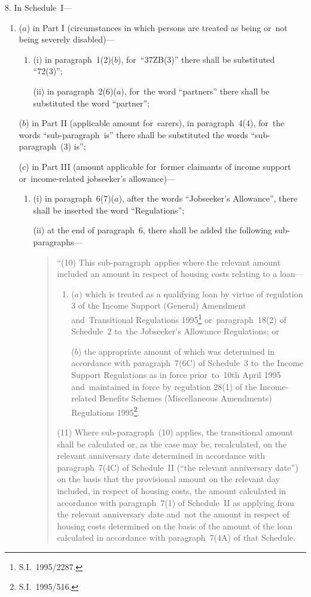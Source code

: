 \documentclass[12pt,a4paper]{article}
\begin{document}
8.  In Schedule~I—
\begin{enumerate}\item[]
($a$) in Part I (circumstances in which persons are treated as being or~not being severely disabled)—
\begin{enumerate}\item[]
(i) in paragraph~1(2)($b$), for~“37ZB(3)” there shall be substituted “72(3)”;

(ii) in paragraph~2(6)($a$), for~the word “partners” there shall be substituted the word “partner”;
\end{enumerate}

($b$) in Part II (applicable amount for~carers), in paragraph~4(4), for~the words “sub-paragraph~is” there shall be substituted the words “sub-paragraph~(3) is”;

($c$) in Part III (amount applicable for~former claimants of income support or~income-related jobseeker’s allowance)—
\begin{enumerate}\item[]
(i) in paragraph~6(7)($a$), after the words “Jobseeker’s Allowance”, there shall be inserted the word “Regulations”;

(ii) at the end of paragraph~6, there shall be added the following sub-paragraphs—
\begin{quotation}
\begin{sloppypar}
“(10) This sub-paragraph~applies where the relevant amount included an amount in respect of housing costs relating to a loan—
\end{sloppypar}
\begin{enumerate}\item[]
($a$) which is treated as a qualifying loan by virtue of regulation 3 of the Income Support (General) Amendment and~Transitional Regulations 1995\footnote{S.I.~1995/2287.} or~paragraph~18(2) of Schedule~2 to~the Jobseeker’s Allowance Regulations; or

($b$) the appropriate amount of which was determined in accordance with paragraph~7(6C) of Schedule~3 to~the Income Support Regulations as in force prior~to~10th April 1995 and~maintained in force by regulation 28(1) of the Income-related Benefits Schemes (Miscellaneous Amendments) Regulations 1995\footnote{S.I.~1995/516.}.
\end{enumerate}

(11) Where sub-paragraph~(10) applies, the transitional amount shall be calculated or, as the case may be, recalculated, on the relevant anniversary date determined in accordance with paragraph~7(4C) of Schedule~II (“the relevant anniversary date”) on the basis that the provisional amount on the relevant day included, in respect of housing costs, the amount calculated in accordance with paragraph~7(1) of Schedule~II as applying from the relevant anniversary date and~not the amount in respect of housing costs determined on the basis of the amount of the loan calculated in accordance with paragraph~7(4A) of that Schedule.


\end{quotation}
\end{enumerate}
\end{enumerate}
\end{document}

